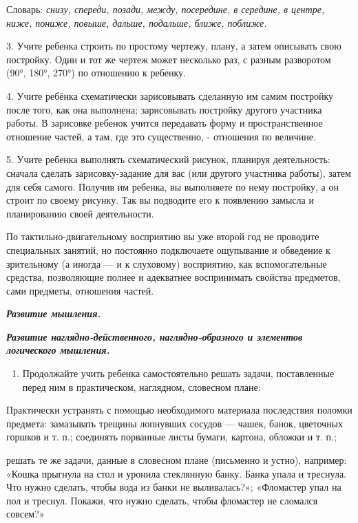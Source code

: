 \documentclass[a5paper]{book}
\renewcommand{\emph}[1]{\textit{#1}}
\begin{document}
Словарь: \emph{снизу, спереди, позади, между, посередине, в середине, в
центре, ниже, пониже, повыше, дальше, подальше, ближе, поближе.}

3. Учите ребенка строить по простому чертежу, плану, а затем описывать
свою постройку. Один и тот же чертеж может несколько раз, с разным
разворотом (90°, 180°, 270°) по отношению к ребенку.

4. Учите ребёнка схематически зарисовывать сделанную им самим постройку
после того, как она выполнена; зарисовывать постройку другого участника
работы. В зарисовке ребенок учится передавать форму и пространственное
отношение частей, а там, где это существенно, - отношения по величине.

5. Учите ребенка выполнять схематический рисунок, планируя деятельность:
сначала сделать зарисовку-задание для вас (или другого участника
работы), затем для себя самого. Получив им ребенка, вы выполняете по
нему постройку, а он строит по своему рисунку. Так вы подводите его к
появлению замысла и планированию своей деятельности.

По тактильно-двигательному восприятию вы уже второй год не проводите
специальных занятий, но постоянно подключаете ощупывание и обведение к
зрительному (а иногда --- и к слуховому) восприятию, как вспомогательные
средства, позволяющие полнее и адекватнее воспринимать свойства
предметов, сами предметы, отношения частей.

\emph{\textbf{Развитие мышления.}}

\emph{\textbf{Развитие наглядно-действенного, наглядно-образного и
элементов логического мышления.}}


\begin{enumerate}
\def\labelenumi{\arabic{enumi}.}
\item
  
  Продолжайте учить ребенка самостоятельно решать задачи, поставленные
  перед ним в практическом, наглядном, словесном плане:
  
\end{enumerate}


Практически устранять с помощью необходимого материала последствия
поломки предмета: замазывать трещины лопнувших сосудов --- чашек, банок,
цветочных горшков и т. п.; соединять порванные листы бумаги, картона,
обложки и т. п.;

решать те же задачи, данные в словесном плане (письменно и устно),
например: «Кошка прыгнула на стол и уронила стеклянную банку. Банка
упала и треснула. Что нужно сделать, чтобы вода из банки не
выливалась?»; «Фломастер упал на пол и треснул. Покажи, что нужно
сделать, чтобы фломастер не сломался совсем?»
\end{document}
